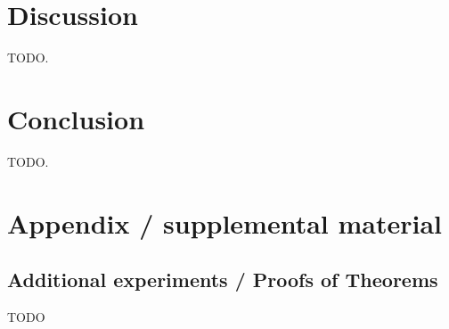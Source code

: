 \documentclass{article}
\begin{document}
\section{Discussion}\label{sec:disc}

TODO.

\section{Conclusion}\label{sec:concl}

TODO.







\newpage
\appendix
\section{Appendix / supplemental material}\label{app}

\subsection{Additional experiments / Proofs of Theorems}\label{app:exp}

TODO
\end{document}
